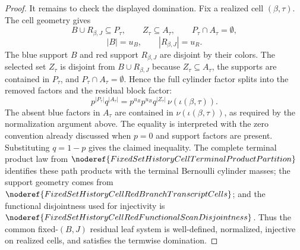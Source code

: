 \begin{proof}
It remains to check the displayed domination.  Fix a realized cell
\((\beta,\tau)\).  The cell geometry gives
\[
B\cup R_{\beta,J}\subseteq P_\tau,\qquad
Z_\tau\subseteq A_\tau,\qquad P_\tau\cap A_\tau=\emptyset,
\]
\[
|B|=u_B,\qquad |R_{\beta,J}|=u_R.
\]
The blue support \(B\) and red support \(R_{\beta,J}\) are disjoint by their
colors.  The selected set \(Z_\tau\) is disjoint from \(B\cup R_{\beta,J}\)
because \(Z_\tau\subseteq A_\tau\), the supports are contained in
\(P_\tau\), and \(P_\tau\cap A_\tau=\emptyset\).  Hence the full cylinder
factor splits into the removed factors and the residual block factor:
\[
p^{|P_\tau|}q^{|A_\tau|}
=
p^{u_R}p^{u_B}q^{|Z_\tau|}\,
  \nu(\iota(\beta,\tau)).
\]
The absent blue factors in \(A_\tau\) are contained in
\(\nu(\iota(\beta,\tau))\), as required by the normalization argument above.
The equality is interpreted with the zero convention already discussed when
\(p=0\) and support factors are present.
Substituting \(q=1-p\) gives the claimed inequality.  The complete terminal product law from
\(\noderef{FixedSetHistoryCellTerminalProductPartition}\) identifies these
path products with the terminal Bernoulli cylinder masses; the support
geometry comes from
\(\noderef{FixedSetHistoryCellRedBranchTranscriptCells}\); and the
functional disjointness used for injectivity is
\(\noderef{FixedSetHistoryCellRedFunctionalScanDisjointness}\).  Thus the
common fixed-\((B,J)\) residual leaf system is well-defined, normalized,
injective on realized cells, and satisfies the termwise domination.
\end{proof}
